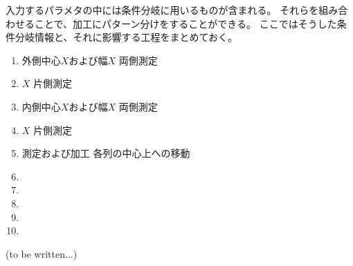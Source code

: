 

入力するパラメタの中には条件分岐に用いるものが含まれる。
それらを組み合わせることで、加工にパターン分けをすることができる。
ここではそうした条件分岐情報と、それに影響する工程をまとめておく。


\begin{enumerate}[label=\sarrow]
\item 外側中心$X$および幅$X$ 両側測定
\item \KeywayCenter$X$ 片側測定
\item 内側中心$X$および幅$X$ 両側測定
\item \OutcutCenter$X$ 片側測定
\item \indexDimpleMeasurement\indexDimpleMilling\nameDimple 測定および加工 各列の中心上への移動
\item \CurvedOutcutMilling
\item \KeywayMilling
\item \EndFaceOutChamferMilling
\item \EndFaceInChamferMilling
\item \ReliefGrooveMilling
\end{enumerate}


(to be written...)


\clearrightpage
